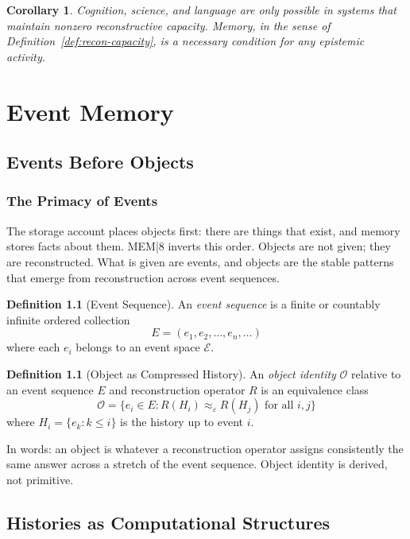 \documentclass[12pt, oneside]{book}
\theoremstyle{plain}
\newtheorem{corollary}[theorem]{Corollary}
\theoremstyle{definition}
\newtheorem{definition}[theorem]{Definition}
\theoremstyle{remark}
\begin{document}
\begin{corollary}
Cognition, science, and language are only possible
in systems that maintain nonzero reconstructive capacity.
Memory, in the sense of Definition~\ref{def:recon-capacity},
is a necessary condition for any epistemic activity.
\end{corollary}

\part{Event Memory}

\chapter{Events Before Objects}

\section{The Primacy of Events}

The storage account places objects first: there are things
that exist, and memory stores facts about them.
MEM|8 inverts this order.
Objects are not given; they are reconstructed.
What is given are events, and objects are the stable patterns
that emerge from reconstruction across event sequences.

\begin{definition}[Event Sequence]
An \emph{event sequence} is a finite or countably infinite
ordered collection
\[
  E = (e_1, e_2, \ldots, e_n, \ldots)
\]
where each $e_i$ belongs to an event space $\mathcal{E}$.
\end{definition}

\begin{definition}[Object as Compressed History]
An \emph{object identity} $\mathcal{O}$ relative to an
event sequence $E$ and reconstruction operator $R$ is
an equivalence class
\[
  \mathcal{O} = \{e_i \in E : R(H_i) \approx_\varepsilon R(H_j)
  \text{ for all } i, j\}
\]
where $H_i = \{e_k : k \leq i\}$ is the history up to
event $i$.
\end{definition}

In words: an object is whatever a reconstruction operator
assigns consistently the same answer across a stretch of
the event sequence.
Object identity is derived, not primitive.

\chapter{Histories as Computational Structures}
\end{document}
